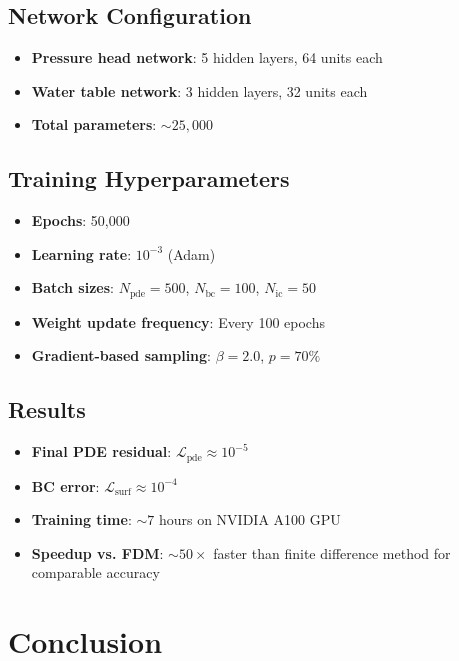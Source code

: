 \documentclass[11pt,a4paper]{article}
\begin{document}
\subsection{Network Configuration}

\begin{itemize}
    \item \textbf{Pressure head network}: 5 hidden layers, 64 units each
    \item \textbf{Water table network}: 3 hidden layers, 32 units each
    \item \textbf{Total parameters}: $\sim 25{,}000$
\end{itemize}

\subsection{Training Hyperparameters}

\begin{itemize}
    \item \textbf{Epochs}: 50,000
    \item \textbf{Learning rate}: $10^{-3}$ (Adam)
    \item \textbf{Batch sizes}: $N_{\text{pde}} = 500$, $N_{\text{bc}} = 100$, $N_{\text{ic}} = 50$
    \item \textbf{Weight update frequency}: Every 100 epochs
    \item \textbf{Gradient-based sampling}: $\beta = 2.0$, $p = 70\%$
\end{itemize}

\subsection{Results}

\begin{itemize}
    \item \textbf{Final PDE residual}: $\mathcal{L}_{\text{pde}} \approx 10^{-5}$
    \item \textbf{BC error}: $\mathcal{L}_{\text{surf}} \approx 10^{-4}$
    \item \textbf{Training time}: $\sim 7$ hours on NVIDIA A100 GPU
    \item \textbf{Speedup vs. FDM}: $\sim 50\times$ faster than finite difference method for comparable accuracy
\end{itemize}

\section{Conclusion}
\end{document}
